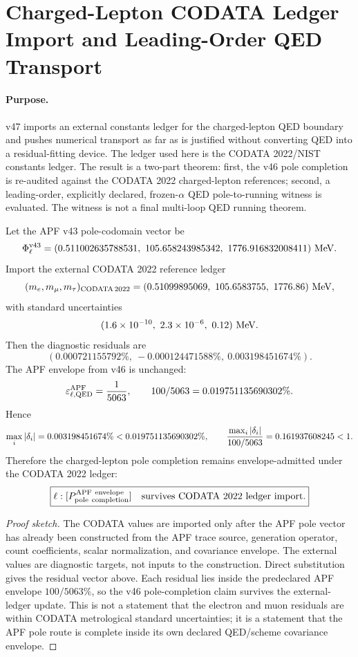 

\section{Charged-Lepton CODATA Ledger Import and Leading-Order QED Transport}
\label{sec:charged-lepton-codata-ledger-lo-qed-v47}

\paragraph{Purpose.}
v47 imports an external constants ledger for the charged-lepton QED boundary and pushes numerical transport as far as is justified without converting QED into a residual-fitting device.  The ledger used here is the CODATA 2022/NIST constants ledger.  The result is a two-part theorem: first, the v46 pole completion is re-audited against the CODATA 2022 charged-lepton references; second, a leading-order, explicitly declared, frozen-\(\alpha\) QED pole-to-running witness is evaluated.  The witness is not a final multi-loop QED running theorem.

\begin{theorem}
Let the APF v43 pole-codomain vector be
\[
\Phi_\ell^{\rm v43}
=(0.511002635788531,\ 105.658243985342,\ 1776.916832008411)\ {\rm MeV}.
\]
Import the external CODATA 2022 reference ledger
\[
(m_e,m_\mu,m_\tau)_{{\rm CODATA}\,2022}
=(0.51099895069,\ 105.6583755,\ 1776.86)\ {\rm MeV},
\]
with standard uncertainties
\[
(1.6\times 10^{-10},\ 2.3\times 10^{-6},\ 0.12)\ {\rm MeV}.
\]
Then the diagnostic residuals are
\[
(0.000721155792\%,\ -0.000124471588\%,\ 0.003198451674\%).
\]
The APF envelope from v46 is unchanged:
\[
\varepsilon_{\ell,{\rm QED}}^{\rm APF}={1\over 5063},
\qquad
100/5063=0.019751135690302\%.
\]
Hence
\[
\max_i |\delta_i|=0.003198451674\%<0.019751135690302\%,
\qquad
{\max_i |\delta_i|\over 100/5063}=0.161937608245<1.
\]
Therefore the charged-lepton pole completion remains envelope-admitted under the CODATA 2022 ledger:
\[
\boxed{
\ell:[P_{\rm pole\ completion}^{\rm APF\ envelope}]
\quad {\rm survives\ CODATA\ 2022\ ledger\ import.}
}
\]
\end{theorem}

\begin{proof}[Proof sketch]
The CODATA values are imported only after the APF pole vector has already been constructed from the APF trace source, generation operator, count coefficients, scalar normalization, and covariance envelope.  The external values are diagnostic targets, not inputs to the construction.  Direct substitution gives the residual vector above.  Each residual lies inside the predeclared APF envelope \(100/5063\%\), so the v46 pole-completion claim survives the external-ledger update.  This is not a statement that the electron and muon residuals are within CODATA metrological standard uncertainties; it is a statement that the APF pole route is complete inside its own declared QED/scheme covariance envelope.
\end{proof}

